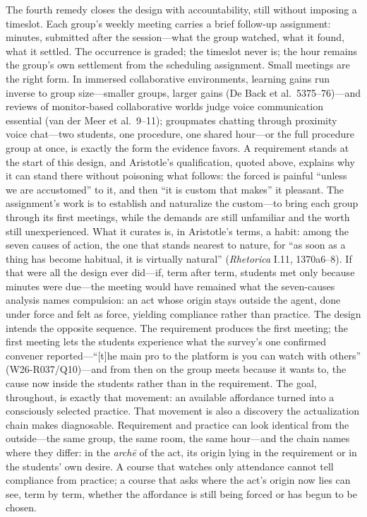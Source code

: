 The fourth remedy closes the design with accountability, still without
imposing a timeslot. Each group's weekly meeting carries a brief
follow-up assignment: minutes, submitted after the session---what the
group watched, what it found, what it settled. The occurrence is
graded; the timeslot never is; the hour remains the group's own
settlement from the scheduling assignment. Small meetings are the
right form. In immersed collaborative environments, learning gains run
inverse to group size---smaller groups, larger gains (De Back et al.\
5375--76)---and reviews of monitor-based collaborative worlds judge
voice communication essential (van der Meer et al.\ 9--11);
groupmates chatting through proximity voice chat---two students, one
procedure, one shared hour---or the full procedure group at once, is
exactly the form the evidence favors. A requirement stands at the start of this
design, and Aristotle's qualification, quoted above, explains why it
can stand there without poisoning what follows: the forced is painful
``unless we are accustomed'' to it, and then ``it is custom that
makes'' it pleasant. The assignment's work is to establish and naturalize the custom---to
bring each group through its first meetings, while the demands are
still unfamiliar and the worth still unexperienced. What it curates
is, in Aristotle's terms, a habit: among the seven causes of action,
the one that stands nearest to nature, for ``as soon as a thing has
become habitual, it is virtually natural'' (\textit{Rhetorica} I.11,
1370a6--8). If that were all
the design ever did---if, term after term, students met only because
minutes were due---the meeting would have remained what the
seven-causes analysis names compulsion: an act whose origin stays
outside the agent, done under force and felt as force, yielding
compliance rather than practice. The design intends the opposite
sequence. The requirement produces the first meeting; the first
meeting lets the students experience what the survey's one confirmed
convener reported---``[t]he main pro to the platform is you can watch
with others'' (W26-R037/Q10)---and from then on the group meets
because it wants to, the cause now inside the students rather than in
the requirement. The goal, throughout, is exactly that movement: an
available affordance turned into a consciously selected practice. That
movement is also a discovery the actualization chain makes diagnosable.
Requirement and practice can look identical from the outside---the same
group, the same room, the same hour---and the chain names where they
differ: in the \textit{arch\=e} of the act, its origin lying in the
requirement or in the students' own desire. A course that watches only
attendance cannot tell compliance from practice; a course that asks
where the act's origin now lies can see, term by term, whether the
affordance is still being forced or has begun to be chosen.

